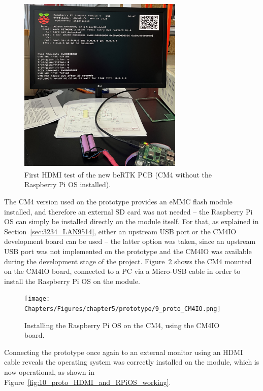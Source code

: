 \begin{figure}[h]
	\centering
	\includegraphics[width=0.7\textwidth]{Chapters/Figures/chapter5/prototype/HDMI_CM4_not_working.png}
	\caption{First HDMI test of the new beRTK\textsuperscript{\textregistered} PCB (CM4 without the Raspberry Pi OS installed).}
	\label{fig:HDMI_CM4_not_working}
\end{figure}%

The CM4 version used on the prototype provides an eMMC flash module installed, and therefore an external SD card was not needed -- the Raspberry Pi OS can simply be installed directly on the module itself. For that, as explained in Section~\ref{sec:3234_LAN9514}, either an upstream USB port or the CM4IO development board can be used -- the latter option was taken, since an upstream USB port was not implemented on the prototype and the CM4IO was available during the development stage of the project. Figure~\ref{fig:9_proto_CM4IO} shows the CM4 mounted on the CM4IO board, connected to a PC via a Micro-USB cable in order to install the Raspberry Pi OS on the module.

\begin{figure}[h]
	\centering
	\texttt{[image: Chapters/Figures/chapter5/prototype/9\_proto\_CM4IO.png]}
	\caption{Installing the Raspberry Pi OS on the CM4, using the CM4IO board.}
	\label{fig:9_proto_CM4IO}
\end{figure}%

Connecting the prototype once again to an external monitor using an HDMI cable reveals the operating system was correctly installed on the module, which is now operational, as shown in Figure~\ref{fig:10_proto_HDMI_and_RPiOS_working}.

